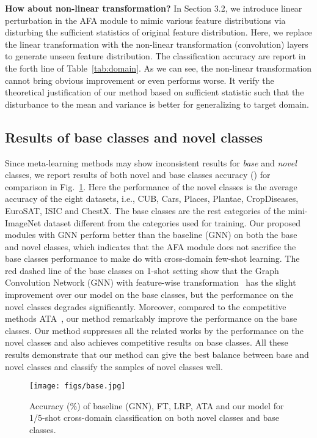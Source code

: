 \documentclass[runningheads]{utils/llncs}
\begin{document}
\noindent
\textbf{How about non-linear transformation?}
In Section 3.2, we introduce linear perturbation in the AFA module to mimic various feature distributions via disturbing the sufficient statistics of original feature distribution. 
Here, we replace the linear transformation with the non-linear transformation (convolution) layers to generate unseen feature distribution.
The classification accuracy are report in the forth line of Table~\ref{tab:domain}. 
As we can see, the non-linear transformation cannot bring obvious improvement or even performs worse. 
It verify the theoretical justification of our method based on sufficient statistic such that the disturbance to the mean and variance is better for generalizing to target domain.


\subsection{Results of base classes and novel classes}
Since meta-learning methods may show inconsistent results for \textit{base} and \textit{novel} classes, we report results of both novel and base classes accuracy () for comparison in Fig.~\ref{figure2}.
Here the performance of the novel classes is the average accuracy of the eight datasets, i.e., CUB, Cars, Places, Plantae, CropDiseases, EuroSAT, ISIC and ChestX.
The base classes are the rest categories of the mini-ImageNet dataset different from the categories used for training. 
Our proposed modules with GNN perform better than the baseline (GNN)  on both the base and novel classes, which indicates that the AFA module does not sacrifice the base classes performance to make do with cross-domain few-shot learning.
The red dashed line of the base classes on 1-shot setting show that the Graph Convolution Network (GNN) with feature-wise transformation~\cite{TsengLH020} has the slight improvement over our model on the base classes, but the performance on the novel classes degrades significantly. 
Moreover, compared to the competitive methods ATA~\cite{WangD21}, our method remarkably improve the performance on the base classes.
Our method suppresses all the related works by the performance on the novel classes and also achieves competitive results on base classes.
All these results demonstrate that our method can give the best balance between base and novel classes and classify the samples of novel classes well.

\begin{figure}[t]
\begin{center}
\texttt{[image: figs/base.jpg]}
\caption{Accuracy (\%) of baseline (GNN), FT, LRP, ATA and our model for 1/5-shot cross-domain classification on both novel classes and base classes. 
   }
\label{figure2}
\end{center}
\end{figure} 
\end{document}
